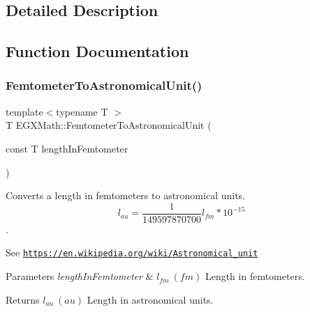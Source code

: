 \subsection{Detailed Description}


\subsection{Function Documentation}
\mbox{\label{group___e_g_x_math-_conversions-_length_conversions-_s_i-_femtometer-_astronomical_ga9c379bc2a0ed6ff83f0d545bab48e909}} 
\subsubsection{\texorpdfstring{Femtometer\+To\+Astronomical\+Unit()}{FemtometerToAstronomicalUnit()}}
{\footnotesize\ttfamily template$<$typename T $>$ \\
T E\+G\+X\+Math\+::\+Femtometer\+To\+Astronomical\+Unit (\begin{DoxyParamCaption}\item[{const T}]{length\+In\+Femtometer }\end{DoxyParamCaption})}



Converts a length in femtometers to astronomical units. \[ l_{au}= \frac{1}{149597870700} l_{fm} * 10^{-15} \]. 

See \href{https://en.wikipedia.org/wiki/Astronomical_unit}{\tt https\+://en.\+wikipedia.\+org/wiki/\+Astronomical\+\_\+unit} 
\begin{DoxyParams}{Parameters}
{\em length\+In\+Femtometer} & $ l_{fm}\ (fm)$ Length in femtometers. \\
\hline
\end{DoxyParams}
\begin{DoxyReturn}{Returns}
$ l_{au}\ (au)$ Length in astronomical units. 
\end{DoxyReturn}
\mbox{\label{group___e_g_x_math-_conversions-_length_conversions-_s_i-_femtometer-_astronomical_gaae002ed0894f79e0fa6889732d52e01d}} 
